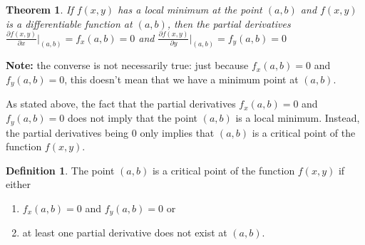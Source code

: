 \documentclass[
]{book}
\newtheorem{theorem}{Theorem}[chapter]
\theoremstyle{definition}
\newtheorem{definition}{Definition}[chapter]
\theoremstyle{definition}
\theoremstyle{definition}
\theoremstyle{definition}
\theoremstyle{remark}
\begin{document}
\begin{theorem}
If \(f(x, y)\) has a local minimum at the point \((a, b)\) and \(f(x, y)\) is a differentiable function at \((a, b)\), then the partial derivatives \(\frac{\partial f(x, y)}{\partial x}|_{(a, b)} = f_x(a, b) = 0\) and \(\frac{\partial f(x, y)}{\partial y}|_{(a, b)} = f_y(a, b) = 0\)
\end{theorem}

\textbf{Note:} the converse is not necessarily true: just because \(f_x(a, b) = 0\) and \(f_y(a, b) = 0\), this doesn't mean that we have a minimum point at \((a, b)\).

As stated above, the fact that the partial derivatives \(f_x(a, b) = 0\) and \(f_y(a, b) = 0\) does not imply that the point \((a, b)\) is a local minimum. Instead, the partial derivatives being 0 only implies that \((a, b)\) is a critical point of the function \(f(x, y)\).

\begin{definition}

The point \((a, b)\) is a critical point of the function \(f(x, y)\) if either

\begin{enumerate}
\def\labelenumi{\alph{enumi})}
\item
  \(f_x(a, b) = 0\) and \(f_y(a, b) = 0\) or
\item
  at least one partial derivative does not exist at \((a, b)\).
\end{enumerate}

\end{definition}
\end{document}
